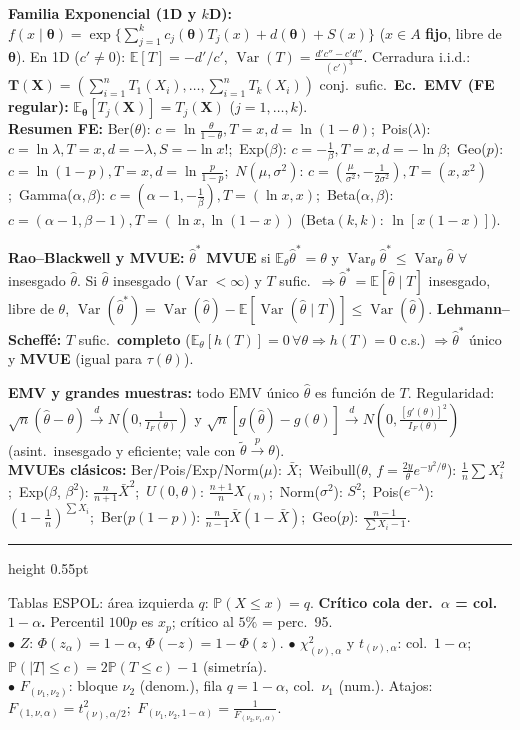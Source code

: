 \documentclass[8pt,a4paper,twocolumn]{extarticle}
\newcommand{\E}{\mathbb{E}}
\newcommand{\Prob}{\mathbb{P}}
\newcommand{\Var}{\operatorname{Var}}
\newcommand{\dto}{\xrightarrow{\;d\;}}
\newcommand{\pto}{\xrightarrow{\;p\;}}
\newcommand{\fh}[1]{\par\vspace{0.7pt}\penalty-100{\color{seccolor}\bfseries #1}\par\nobreak\vspace{0.2pt}\hrule height 0.55pt\relax\par\nobreak\vspace{0.45pt}\nobreak}
\begin{document}
\textbf{Familia Exponencial (1D y $k$D):} $f(x\mid\boldsymbol{\theta})=\exp\{\sum_{j=1}^k c_j(\boldsymbol{\theta})T_j(x)+d(\boldsymbol{\theta})+S(x)\}$ ($x\in A$ \textbf{fijo}, libre de $\boldsymbol{\theta}$). En 1D ($c'\ne0$): $\E[T]=-d'/c'$, $\Var(T)=\frac{d'c''-c'd''}{(c')^3}$. Cerradura i.i.d.: $\mathbf{T}(\mathbf{X})=(\sum_{i=1}^n T_1(X_i),\dots,\sum_{i=1}^n T_k(X_i))$ conj.\ sufic.\ \textbf{Ec.\ EMV (FE regular):} $\E_{\boldsymbol{\theta}}[T_j(\mathbf{X})]=T_j(\mathbf{X})$ ($j=1,\dots,k$).\\
\textbf{Resumen FE:} Ber($\theta$): $c=\ln\frac{\theta}{1-\theta},T=x,d=\ln(1-\theta)$;\ Pois($\lambda$): $c=\ln\lambda,T=x,d=-\lambda,S=-\ln x!$;\ Exp($\beta$): $c=-\frac1\beta,T=x,d=-\ln\beta$;\ Geo($p$): $c=\ln(1-p),T=x,d=\ln\frac{p}{1-p}$;\ $N(\mu,\sigma^2)$: $c=(\frac{\mu}{\sigma^2},-\frac{1}{2\sigma^2}),T=(x,x^2)$;\ Gamma($\alpha,\beta$): $c=(\alpha-1,-\frac1\beta),T=(\ln x,x)$;\ Beta($\alpha,\beta$): $c=(\alpha-1,\beta-1),T=(\ln x,\ln(1-x))$ ($\text{Beta}(k,k)$: $\ln[x(1-x)]$).

\textbf{Rao--Blackwell y MVUE:} $\hat\theta^*$ \textbf{MVUE} si $\E_\theta\hat\theta^*=\theta$ y $\Var_\theta\hat\theta^*\le\Var_\theta\hat\theta$ $\forall$ insesgado $\hat\theta$. Si $\hat\theta$ insesgado ($\Var<\infty$) y $T$ sufic.\ $\Rightarrow\hat\theta^*=\E[\hat\theta\mid T]$ insesgado, libre de $\theta$, $\Var(\hat\theta^*)=\Var(\hat\theta)-\E[\Var(\hat\theta\mid T)]\le\Var(\hat\theta)$. \textbf{Lehmann--Scheffé:} $T$ sufic.\ \textbf{completo} ($\E_\theta[h(T)]=0\,\forall\theta\Rightarrow h(T)=0$ c.s.) $\Rightarrow\hat\theta^*$ único y \textbf{MVUE} (igual para $\tau(\theta)$).

\textbf{EMV y grandes muestras:} todo EMV único $\hat\theta$ es función de $T$. Regularidad: $\sqrt{n}(\hat\theta-\theta)\dto N(0,\frac{1}{I_F(\theta)})$ y $\sqrt{n}[g(\hat\theta)-g(\theta)]\dto N(0,\frac{[g'(\theta)]^2}{I_F(\theta)})$ (asint.\ insesgado y eficiente; vale con $\tilde\theta\pto\theta$).\\
\textbf{MVUEs clásicos:} Ber/Pois/Exp/Norm($\mu$): $\bar X$;\ Weibull($\theta$, $f=\frac{2y}{\theta}e^{-y^2/\theta}$): $\frac1n\sum X_i^2$;\ Exp($\beta$, $\beta^2$): $\frac{n}{n+1}\bar X^2$;\ $U(0,\theta)$: $\frac{n+1}{n}X_{(n)}$;\ Norm($\sigma^2$): $S^2$;\ Pois($e^{-\lambda}$): $(1-\frac1n)^{\sum X_i}$;\ Ber($p(1-p)$): $\frac{n}{n-1}\bar X(1-\bar X)$;\ Geo($p$): $\frac{n-1}{\sum X_i-1}$.

\fh{18. Tablas y valores críticos}
Tablas ESPOL: área izquierda $q$: $\Prob(X\le x)=q$. \textbf{Crítico cola der.\ $\alpha$ = col.\ $1-\alpha$.} Percentil $100p$ es $x_p$; crítico al $5\%$ = perc.\ 95.\\
$\bullet$ $Z$: $\Phi(z_\alpha)=1-\alpha$, $\Phi(-z)=1-\Phi(z)$.\quad
$\bullet$ $\chi^2_{(\nu),\alpha}$ y $t_{(\nu),\alpha}$: col.\ $1-\alpha$; $\Prob(|T|\le c)=2\Prob(T\le c)-1$ (simetría).\\
$\bullet$ $F_{(\nu_1,\nu_2)}$: bloque $\nu_2$ (denom.), fila $q=1-\alpha$, col.\ $\nu_1$ (num.). Atajos: $F_{(1,\nu,\alpha)}=t_{(\nu),\alpha/2}^2$;\ $F_{(\nu_1,\nu_2,1-\alpha)}=\frac{1}{F_{(\nu_2,\nu_1,\alpha)}}$.
\end{document}
